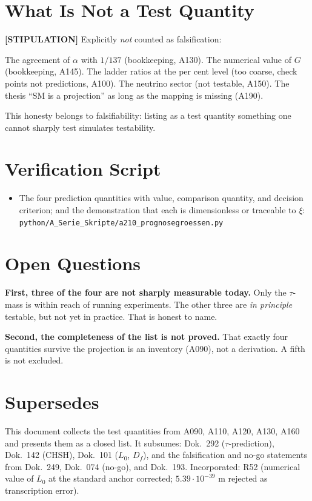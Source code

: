 \section{What Is Not a Test Quantity}

\textbf{[STIPULATION]} Explicitly \emph{not} counted as falsification:

The agreement of $\alpha$ with $1/137$ (bookkeeping, A130). The numerical value
of $G$ (bookkeeping, A145). The ladder ratios at the per cent level (too coarse,
check points not predictions, A100). The neutrino sector (not testable, A150).
The thesis ``SM is a projection'' as long as the mapping is missing (A190).

This honesty belongs to falsifiability: listing as a test quantity something one
cannot sharply test simulates testability.

\section{Verification Script}

\begin{itemize}
  \item The four prediction quantities with value, comparison quantity, and
    decision criterion; and the demonstration that each is dimensionless or
    traceable to $\xi$:
    \texttt{python/A\_Serie\_Skripte/a210\_prognosegroessen.py}
\end{itemize}

\section{Open Questions}

\textbf{First, three of the four are not sharply measurable today.} Only the
$\tau$-mass is within reach of running experiments. The other three are
\emph{in principle} testable, but not yet in practice. That is honest to name.

\textbf{Second, the completeness of the list is not proved.} That exactly four
quantities survive the projection is an inventory (A090), not a derivation. A
fifth is not excluded.

\section{Supersedes}

This document collects the test quantities from A090, A110, A120, A130, A160 and
presents them as a closed list. It subsumes: Dok.~292 ($\tau$-prediction),
Dok.~142 (CHSH), Dok.~101 ($L_0$, $D_f$), and the falsification and no-go
statements from Dok.~249, Dok.~074 (no-go), and Dok.~193. Incorporated: R52
(numerical value of $L_0$ at the standard anchor corrected; $5{.}39\cdot10^{-39}$ m
rejected as transcription error).

